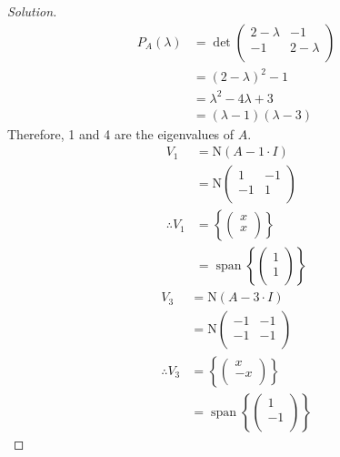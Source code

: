 \documentclass[fleqn, a4paper, 12pt]{article}
\newcommand{\N}{\mathrm{N}}
\theoremstyle{definition}
\theoremstyle{theorem}
\newenvironment{solution}
{\begin{proof}[Solution]\let\qed\relax}
	{\end{proof}}
\DeclareMathOperator{\vspan}{\mathrm{span}} %
\begin{document}
\begin{solution}
	\begin{align*}
		P_A (\lambda) &= \det 
			\begin{pmatrix}
				2 - \lambda & -1\\
				-1 & 2 - \lambda\\
			\end{pmatrix}\\
		&= (2 - \lambda)^2 - 1\\
		&= \lambda^2 - 4 \lambda + 3\\
		&= (\lambda - 1) (\lambda - 3)
	\end{align*}
	Therefore, 1 and 4 are the eigenvalues of $A$.
	\begin{align*}
		V_1 &= \N (A - 1 \cdot I)\\
		&= \N 
			\begin{pmatrix}
				1 & -1\\
				-1 & 1\\
			\end{pmatrix}\\
		\therefore V_1 &=
			\left\lbrace
				\begin{pmatrix}
					x\\
					x\\
				\end{pmatrix}
			\right\rbrace\\
		&= \vspan
			\left\lbrace
				\begin{pmatrix}
					1\\
					1\\
				\end{pmatrix}
			\right\rbrace
	\end{align*}
	\begin{align*}
		V_3 &= \N (A - 3 \cdot I)\\
		&= \N
			\begin{pmatrix}
				-1 & -1\\
				-1 & -1\\
			\end{pmatrix}\\
		\therefore V_3 &= 
			\left\lbrace
				\begin{pmatrix}
					x\\
					-x\\
				\end{pmatrix}
			\right\rbrace\\
		&= \vspan
			\left\lbrace
				\begin{pmatrix}
					1\\
					-1\\
				\end{pmatrix}
			\right\rbrace
	\end{align*}
\end{solution}
\end{document}
